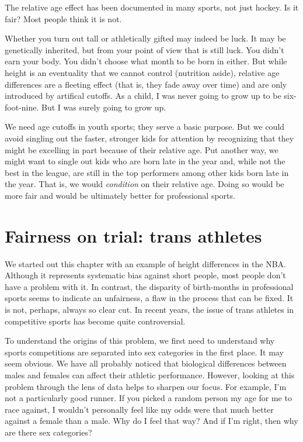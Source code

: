 \documentclass[
  openany]{book}
\begin{document}
The relative age effect has been documented in many sports, not just hockey. Is it fair? Most people think it is not.

Whether you turn out tall or athletically gifted may indeed be luck. It may be genetically inherited, but from your point of view that is still luck. You didn't earn your body. You didn't choose what month to be born in either. But while height is an eventuality that we cannot control (nutrition aside), relative age differences are a fleeting effect (that is, they fade away over time) and are only introduced by artifical cutoffs. As a child, I was never going to grow up to be six-foot-nine. But I was surely going to grow up.

We need age cutoffs in youth sports; they serve a basic purpose. But we could avoid singling out the faster, stronger kids for attention by recognizing that they might be excelling in part because of their relative age. Put another way, we might want to single out kids who are born late in the year and, while not the best in the league, are still in the top performers among other kids born late in the year. That is, we would \emph{condition} on their relative age. Doing so would be more fair and would be ultimately better for professional sports.

\hypertarget{fairness-on-trial-trans-athletes}{%
\section*{Fairness on trial: trans athletes}\label{fairness-on-trial-trans-athletes}}

We started out this chapter with an example of height differences in the NBA. Although it represents systematic bias against short people, most people don't have a problem with it. In contrast, the disparity of birth-months in professional sports seems to indicate an unfairness, a flaw in the process that can be fixed. It is not, perhaps, always so clear cut. In recent years, the issue of trans athletes in competitive sports has become quite controversial.

To understand the origins of this problem, we first need to understand why sports competitions are separated into sex categories in the first place. It may seem obvious. We have all probably noticed that biological differences between males and females can affect their athletic performance. However, looking at this problem through the lens of data helps to sharpen our focus. For example, I'm not a particularly good runner. If you picked a random person my age for me to race against, I wouldn't personally feel like my odds were that much better against a female than a male. Why do I feel that way? And if I'm right, then why are there sex categories?
\end{document}
